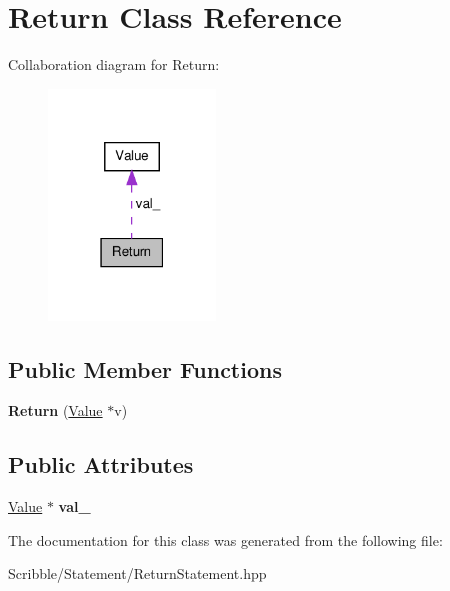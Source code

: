 \hypertarget{class_return}{\section{Return Class Reference}
\label{class_return}
}


Collaboration diagram for Return\-:
\nopagebreak
\begin{figure}[H]
\begin{center}
\leavevmode
\includegraphics[width=126pt]{class_return__coll__graph}
\end{center}
\end{figure}
\subsection*{Public Member Functions}
\begin{DoxyCompactItemize}
\item 
\hypertarget{class_return_a6294ed798e23d9d41ce4c44818e703d5}{{\bfseries Return} (\hyperlink{class_value}{Value} $\ast$v)}\label{class_return_a6294ed798e23d9d41ce4c44818e703d5}

\end{DoxyCompactItemize}
\subsection*{Public Attributes}
\begin{DoxyCompactItemize}
\item 
\hypertarget{class_return_a2a42e217e87c66282676d0582d33d0bd}{\hyperlink{class_value}{Value} $\ast$ {\bfseries val\-\_\-}}\label{class_return_a2a42e217e87c66282676d0582d33d0bd}

\end{DoxyCompactItemize}


The documentation for this class was generated from the following file\-:\begin{DoxyCompactItemize}
\item 
Scribble/\-Statement/Return\-Statement.\-hpp\end{DoxyCompactItemize}
